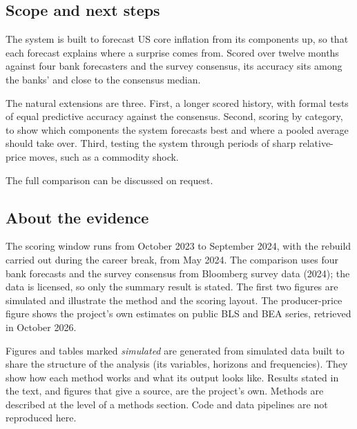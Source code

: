 \documentclass[
  british,
  a4paper,
]{article}
\begin{document}
\subsection{Scope and next steps}\label{scope-and-next-steps}

The system is built to forecast US core inflation from its components
up, so that each forecast explains where a surprise comes from. Scored
over twelve months against four bank forecasters and the survey
consensus, its accuracy sits among the banks' and close to the consensus
median.

The natural extensions are three. First, a longer scored history, with
formal tests of equal predictive accuracy against the consensus. Second,
scoring by category, to show which components the system forecasts best
and where a pooled average should take over. Third, testing the system
through periods of sharp relative-price moves, such as a commodity
shock.

The full comparison can be discussed on request.

\subsection{About the evidence}\label{about-the-evidence}

The scoring window runs from October 2023 to September 2024, with the
rebuild carried out during the career break, from May 2024. The
comparison uses four bank forecasts and the survey consensus from
Bloomberg survey data (2024); the data is licensed, so only the summary
result is stated. The first two figures are simulated and illustrate the
method and the scoring layout. The producer-price figure shows the
project's own estimates on public BLS and BEA series, retrieved in
October 2026.

Figures and tables marked \emph{simulated} are generated from simulated
data built to share the structure of the analysis (its variables,
horizons and frequencies). They show how each method works and what its
output looks like. Results stated in the text, and figures that give a
source, are the project's own. Methods are described at the level of a
methods section. Code and data pipelines are not reproduced here.
\end{document}
